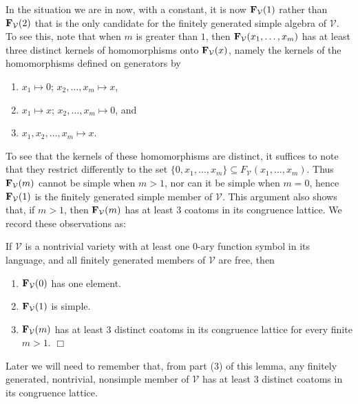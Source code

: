 In the situation we are in now, with a constant,
it is now ${{\mathbf{\uppercase{f}}}}_{\mathcal V}(1)$ rather than
${{\mathbf{\uppercase{f}}}}_{\mathcal V}(2)$ that is the only candidate
for the finitely generated simple algebra of $\mathcal V$.
To see this, note that when $m$ is greater than $1$, then 
${{\mathbf{\uppercase{f}}}}_{\mathcal V}(x_1,\ldots,x_m)$ has at least
three distinct kernels of homomorphisms onto ${{\mathbf{\uppercase{f}}}}_{\mathcal V}(x)$,
namely the kernels of the homomorphisms defined on generators by
  \begin{enumerate}
  \item $x_1\mapsto 0$; $x_2, \ldots, x_m\mapsto x$, 
  \item $x_1\mapsto x$; $x_2, \ldots, x_m\mapsto 0$, and
  \item $x_1, x_2, \ldots, x_m\mapsto x$.
  \end{enumerate}
  To see that the kernels of these homomorphisms are distinct,
  it suffices to note that they restrict differently to
  the set $\{0,x_1,\ldots,x_m\}\subseteq F_{\mathcal V}(x_1,\ldots,x_m)$.
  Thus ${{\mathbf{\uppercase{f}}}}_{\mathcal V}(m)$ cannot be simple when $m>1$, nor
  can it be simple when $m=0$,
  hence ${{\mathbf{\uppercase{f}}}}_{\mathcal V}(1)$ is the 
  finitely generated simple member of $\mathcal V$. This argument
  also shows that, if $m>1$, then ${{\mathbf{\uppercase{f}}}}_{\mathcal V}(m)$ has at least
  $3$ coatoms in its congruence lattice. We record these observations as:

  \begin{lm}\label{3coatoms}
    If $\mathcal V$ is a nontrivial variety with
    at least one $0$-ary function symbol in its language, and
    all finitely generated members of $\mathcal V$ are free, then
    \begin{enumerate}
    \item ${{\mathbf{\uppercase{f}}}}_{\mathcal V}(0)$ has one element.
    \item ${{\mathbf{\uppercase{f}}}}_{\mathcal V}(1)$ is simple.
    \item ${{\mathbf{\uppercase{f}}}}_{\mathcal V}(m)$ has at least $3$ distinct coatoms in
      its congruence lattice for every finite $m>1$.      $\Box$
      \end{enumerate} 
  \end{lm}

  Later we will need to remember that, from part (3) of this lemma,
  any finitely generated, nontrivial, nonsimple member of $\mathcal V$
  has at least 3 distinct coatoms in its congruence lattice.

